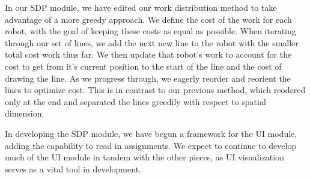 In our SDP module, we have edited our work distribution method to take advantage of a more greedy approach. We define the cost of the work for each robot, with the goal of keeping these costs as equal as possible. When iterating through our set of lines, we add the next new line to the robot with the smaller total cost work thus far. We then update that robot's work to account for the cost to get from it's current position to the start of the line and the cost of drawing the line. As we progress through, we eagerly reorder and reorient the lines to optimize cost. This is in contrast to our previous method, which reodered only at the end and separated the lines greedily with respect to spatial dimension. 

In developing the SDP module, we have begun a framework for the UI module, adding the capability to read in assignments. We expect to continue to develop much of the UI module in tandem with the other pieces, as UI visualization serves as a vital tool in development. 
